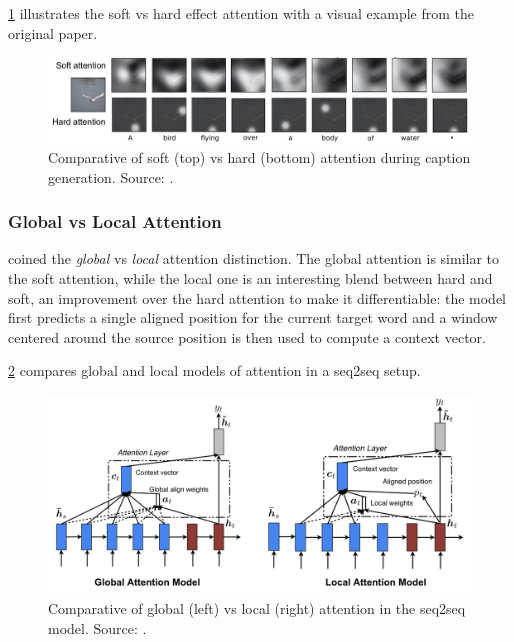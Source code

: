 \cref{fig:soft-vs-hard-attention} illustrates the soft vs hard effect attention with a visual example from the original paper.

\begin{figure}[hpt]
    \centering
    \includegraphics[scale=0.3]{images/ch3/soft-vs-hard-attention.png}
    \caption{Comparative of soft (top) vs hard (bottom) attention during caption generation. Source: \citep{Xu2015}.}
    \label{fig:soft-vs-hard-attention}
\end{figure}

\subsubsection{Global vs Local Attention}

\citet{Luong2015} coined the \textit{global} vs \textit{local} attention distinction. The global attention is similar to the soft attention, while the local one is an interesting blend between hard and soft, an improvement over the hard attention to make it differentiable: the model first predicts a single aligned position for the current target word and a window centered around the source position is then used to compute a context vector.

\cref{fig:global-vs-local-attention} compares global and local models of attention in a seq2seq setup.

\begin{figure}[hpt]
    \centering
    \includegraphics[scale=0.3]{images/ch3/global-vs-local-attention.png}
    \caption{Comparative of global (left) vs local (right) attention in the seq2seq model. Source: \citep{Luong2015}.}
    \label{fig:global-vs-local-attention}
\end{figure}

